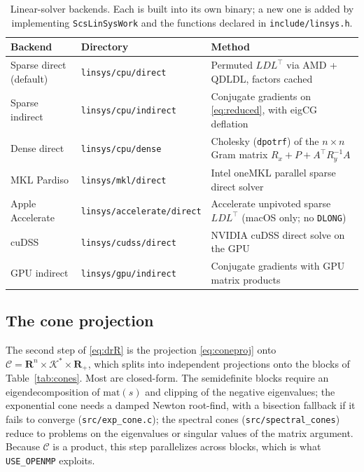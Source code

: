 \documentclass[11pt,a4paper]{article}
\newcommand{\R}{\mathbf{R}}
\newcommand{\K}{\mathcal{K}}
\newcommand{\C}{\mathcal{C}}
\newcommand{\tr}{^\top}
\theoremstyle{plain}
\begin{document}
\begin{table}[t]
\centering
\small
\begin{tabular}{@{}llp{7.2cm}@{}}
\toprule
Backend & Directory & Method \\
\midrule
Sparse direct (default) & \texttt{linsys/cpu/direct}     & Permuted $LDL\tr$ via AMD + QDLDL, factors cached \\
Sparse indirect         & \texttt{linsys/cpu/indirect}   & Conjugate gradients on \eqref{eq:reduced}, with eigCG deflation \\
Dense direct            & \texttt{linsys/cpu/dense}      & Cholesky (\texttt{dpotrf}) of the $n \times n$ Gram matrix $R_x + P + A\tr R_y^{-1}A$ \\
MKL Pardiso             & \texttt{linsys/mkl/direct}     & Intel oneMKL parallel sparse direct solver \\
Apple Accelerate        & \texttt{linsys/accelerate/direct} & Accelerate unpivoted sparse $LDL\tr$ (macOS only; no \texttt{DLONG}) \\
cuDSS                   & \texttt{linsys/cudss/direct}   & NVIDIA cuDSS direct solve on the GPU \\
GPU indirect            & \texttt{linsys/gpu/indirect}   & Conjugate gradients with GPU matrix products \\
\bottomrule
\end{tabular}
\caption{Linear-solver backends. Each is built into its own binary; a new one
is added by implementing \texttt{ScsLinSysWork} and the functions declared in
\texttt{include/linsys.h}.}
\label{tab:linsys}
\end{table}

\subsection{The cone projection}

The second step of \eqref{eq:drR} is the projection \eqref{eq:coneproj} onto
$\C = \R^n \times \K^* \times \R_+$, which splits into independent projections
onto the blocks of Table~\ref{tab:cones}. Most are closed-form. The
semidefinite blocks require an eigendecomposition of $\mathrm{mat}(s)$ and
clipping of the negative eigenvalues; the exponential cone needs a damped
Newton root-find, with a bisection fallback if it fails to converge
(\texttt{src/exp\_cone.c}); the spectral cones
(\texttt{src/spectral\_cones}) reduce to problems on the eigenvalues or
singular values of the matrix argument. Because $\C$ is a product, this step
parallelizes across blocks, which is what \texttt{USE\_OPENMP} exploits.
\end{document}
